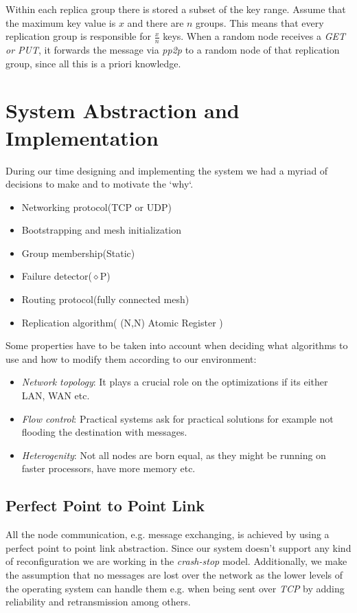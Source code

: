 \documentclass[a4paper, 11pt]{article}
\begin{document}
Within each replica group there is stored a subset of the key range. Assume that the maximum key value is $x$ and there are $n$ groups. This means that every replication group is responsible for $\frac{x}{n}$ keys. When a random node receives a \textit{GET or PUT}, it forwards the message via \textit{pp2p} to a random node of that replication group, since all this is a priori knowledge. \par

\section{System Abstraction and Implementation}

During our time designing and implementing the system we had a myriad of decisions to make and to motivate the `why`.

\begin{itemize}
	\item Networking protocol(TCP or UDP)
	\item Bootstrapping and mesh initialization
	\item Group membership(Static)
	\item Failure detector($\diamond$P)
	\item Routing protocol(fully connected mesh)
	\item Replication algorithm( (N,N) Atomic Register )
\end{itemize}

Some properties have to be taken into account when deciding what algorithms to use and how to modify them according to our environment:
\begin{itemize}
	\item \textit{Network topology}: It plays a crucial role on the optimizations if its either LAN, WAN etc.
	\item \textit{Flow control}: Practical systems ask for practical solutions for example not flooding the destination with messages.
	\item \textit{Heterogenity}: Not all nodes are born equal, as they might be running on faster processors, have more memory etc.
\end{itemize}

\subsection{Perfect Point to Point Link}

All the node communication, e.g. message exchanging, is achieved by using a perfect point to point link abstraction. Since our system doesn't support any kind of reconfiguration we are working in the \textit{crash-stop} model. Additionally, we make the assumption that no messages are lost over the network as the lower levels of the operating system can handle them e.g. when being sent over \textit{TCP} by adding reliability and retransmission among others. \par 
\end{document}
